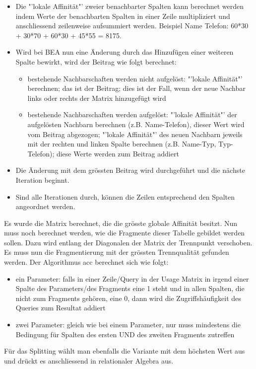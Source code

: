 \documentclass[a4paper,10pt,titlepage=false]{scrreprt}
\begin{document}
\begin{itemize}
\item Die "'lokale Affinität"' zweier benachbarter Spalten kann berechnet werden indem Werte der benachbarten Spalten in einer Zeile multipliziert und anschliessend zeilenweise aufsummiert werden. Beispiel Name Telefon: 60*30 + 30*70 + 60*30 + 45*55 = 8175.
\item Wird bei BEA nun eine Änderung durch das Hinzufügen einer weiteren Spalte bewirkt, wird der Beitrag wie folgt berechnet:
\begin{itemize}
\item bestehende Nachbarschaften werden nicht aufgelöst: "'lokale Affinität"' berechnen; das ist der Beitrag; dies ist der Fall, wenn der neue Nachbar links oder rechts der Matrix hinzugefügt wird
\item bestehende Nachbarschaften werden aufgelöst: "'lokale Affinität"' der aufgelösten Nachbarn berechnen (z.B. Name-Telefon), dieser Wert wird vom Beitrag abgezogen; "'lokale Affinität"' des neuen Nachbarn jeweils mit der rechten und linken Spalte berechnen (z.B. Name-Typ, Typ-Telefon); diese Werte werden zum Beitrag addiert
\end{itemize}
\item Die Änderung mit dem grössten Beitrag wird durchgeführt und die nächste Iteration beginnt.
\item Sind alle Iterationen durch, können die Zeilen entsprechend den Spalten angeordnet werden.
\end{itemize}
Es wurde die Matrix berechnet, die die grösste globale Affinität besitzt. Nun muss noch berechnet werden, wie die Fragmente dieser Tabelle gebildet werden sollen. Dazu wird entlang der Diagonalen der Matrix der Trennpunkt verschoben. Es muss nun die Fragmentierung mit der grössten Trennqualität gefunden werden. Der Algorithmus acc berechnet sich wie folgt:
\begin{itemize}
\item ein Parameter: falls in einer Zeile/Query in der Usage Matrix in irgend einer Spalte des Parameters/des Fragments eine 1 steht und in allen Spalten, die nicht zum Fragments gehören, eine 0, dann wird die Zugriffshäufigkeit des Queries zum Resultat addiert
\item zwei Parameter: gleich wie bei einem Parameter, nur muss mindestens die Bedingung für Spalten des ersten UND des zweiten Fragments zutreffen
\end{itemize}
Für das Splitting wählt man ebenfalls die Variante mit dem höchsten Wert aus und drückt es anschliessend in relationaler Algebra aus.
\end{document}

